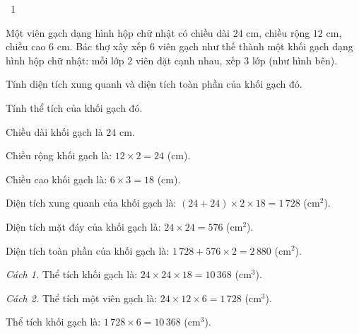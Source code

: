 \begin{exbox}{\ExWord\ 1}
\begin{minipage}[t]{0.6\linewidth}
Một viên gạch dạng hình hộp chữ nhật có chiều dài $24$ cm, chiều rộng $12$ cm, chiều cao $6$ cm. Bác thợ xây xếp $6$ viên gạch như thế thành một khối gạch dạng hình hộp chữ nhật: mỗi lớp $2$ viên đặt cạnh nhau, xếp $3$ lớp (như hình bên).\par
{} Tính diện tích xung quanh và diện tích toàn phần của khối gạch đó.\par
{} Tính thể tích của khối gạch đó.
\end{minipage}\hfill
\begin{minipage}[t]{0.36\linewidth}\vspace{0pt}\centering
{}
\end{minipage}
\guide
{} Chiều dài khối gạch là $24$ cm.\par
Chiều rộng khối gạch là: $12\times2=24$ (cm).\par
Chiều cao khối gạch là: $6\times3=18$ (cm).\par
Diện tích xung quanh của khối gạch là: $(24+24)\times2\times18=1\,728$ (cm$^2$).\par
Diện tích mặt đáy của khối gạch là: $24\times24=576$ (cm$^2$).\par
Diện tích toàn phần của khối gạch là: $1\,728+576\times2=2\,880$ (cm$^2$).\par
{} \emph{Cách 1.} Thể tích khối gạch là: $24\times24\times18=10\,368$ (cm$^3$).\par
\emph{Cách 2.} Thể tích một viên gạch là: $24\times12\times6=1\,728$ (cm$^3$).\par
Thể tích khối gạch là: $1\,728\times6=10\,368$ (cm$^3$).
\end{exbox}
\gap
